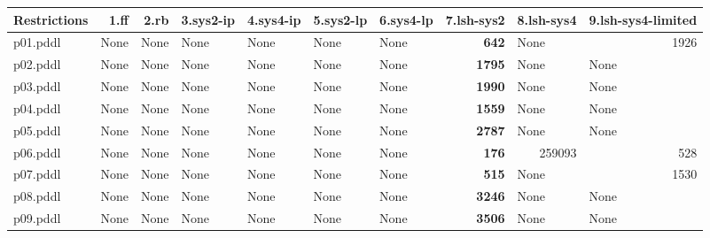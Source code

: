 \documentclass{article}
\begin{document}
\begin{tabular}{@{}lrrrrrrrrr@{}}
Restrictions & 1.ff & 2.rb & 3.sys2-ip & 4.sys4-ip & 5.sys2-lp & 6.sys4-lp & 7.lsh-sys2 & 8.lsh-sys4 & 9.lsh-sys4-limited \\
\midrule
p01.pddl & \multicolumn{1}{|l|}{None} & \multicolumn{1}{|l|}{None} & \multicolumn{1}{|l|}{None} & \multicolumn{1}{|l|}{None} & \multicolumn{1}{|l|}{None} & \multicolumn{1}{|l|}{None} & \textbf{642} & \multicolumn{1}{|l|}{None} & 1926 \\
p02.pddl & \multicolumn{1}{|l|}{None} & \multicolumn{1}{|l|}{None} & \multicolumn{1}{|l|}{None} & \multicolumn{1}{|l|}{None} & \multicolumn{1}{|l|}{None} & \multicolumn{1}{|l|}{None} & \textbf{1795} & \multicolumn{1}{|l|}{None} & \multicolumn{1}{|l|}{None} \\
p03.pddl & \multicolumn{1}{|l|}{None} & \multicolumn{1}{|l|}{None} & \multicolumn{1}{|l|}{None} & \multicolumn{1}{|l|}{None} & \multicolumn{1}{|l|}{None} & \multicolumn{1}{|l|}{None} & \textbf{1990} & \multicolumn{1}{|l|}{None} & \multicolumn{1}{|l|}{None} \\
p04.pddl & \multicolumn{1}{|l|}{None} & \multicolumn{1}{|l|}{None} & \multicolumn{1}{|l|}{None} & \multicolumn{1}{|l|}{None} & \multicolumn{1}{|l|}{None} & \multicolumn{1}{|l|}{None} & \textbf{1559} & \multicolumn{1}{|l|}{None} & \multicolumn{1}{|l|}{None} \\
p05.pddl & \multicolumn{1}{|l|}{None} & \multicolumn{1}{|l|}{None} & \multicolumn{1}{|l|}{None} & \multicolumn{1}{|l|}{None} & \multicolumn{1}{|l|}{None} & \multicolumn{1}{|l|}{None} & \textbf{2787} & \multicolumn{1}{|l|}{None} & \multicolumn{1}{|l|}{None} \\
p06.pddl & \multicolumn{1}{|l|}{None} & \multicolumn{1}{|l|}{None} & \multicolumn{1}{|l|}{None} & \multicolumn{1}{|l|}{None} & \multicolumn{1}{|l|}{None} & \multicolumn{1}{|l|}{None} & \textbf{176} & 259093 & 528 \\
p07.pddl & \multicolumn{1}{|l|}{None} & \multicolumn{1}{|l|}{None} & \multicolumn{1}{|l|}{None} & \multicolumn{1}{|l|}{None} & \multicolumn{1}{|l|}{None} & \multicolumn{1}{|l|}{None} & \textbf{515} & \multicolumn{1}{|l|}{None} & 1530 \\
p08.pddl & \multicolumn{1}{|l|}{None} & \multicolumn{1}{|l|}{None} & \multicolumn{1}{|l|}{None} & \multicolumn{1}{|l|}{None} & \multicolumn{1}{|l|}{None} & \multicolumn{1}{|l|}{None} & \textbf{3246} & \multicolumn{1}{|l|}{None} & \multicolumn{1}{|l|}{None} \\
p09.pddl & \multicolumn{1}{|l|}{None} & \multicolumn{1}{|l|}{None} & \multicolumn{1}{|l|}{None} & \multicolumn{1}{|l|}{None} & \multicolumn{1}{|l|}{None} & \multicolumn{1}{|l|}{None} & \textbf{3506} & \multicolumn{1}{|l|}{None} & \multicolumn{1}{|l|}{None} \\

\end{tabular}
\end{document}
